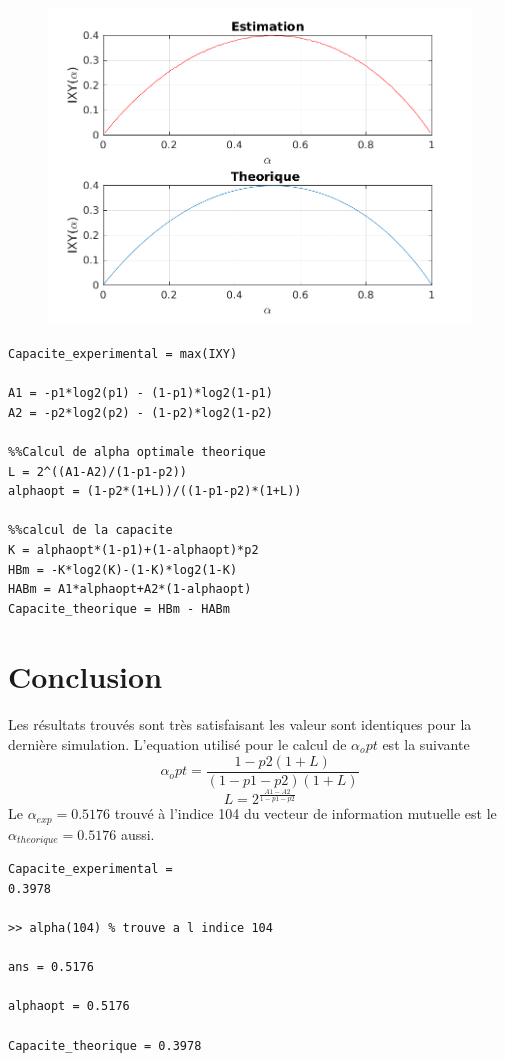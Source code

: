 \documentclass{report}
\begin{document}
\begin{figure}[h]
	\centering
	\captionsetup{justification=centering}
	\includegraphics[width=0.6\linewidth]{../canal3}
	\caption{}
	\label{fig:}
\end{figure}


\begin{lstlisting}[caption={Code calcul de capacite du canal },label=code_]
Capacite_experimental = max(IXY)

A1 = -p1*log2(p1) - (1-p1)*log2(1-p1)
A2 = -p2*log2(p2) - (1-p2)*log2(1-p2)

%%Calcul de alpha optimale theorique
L = 2^((A1-A2)/(1-p1-p2))
alphaopt = (1-p2*(1+L))/((1-p1-p2)*(1+L))

%%calcul de la capacite
K = alphaopt*(1-p1)+(1-alphaopt)*p2
HBm = -K*log2(K)-(1-K)*log2(1-K)
HABm = A1*alphaopt+A2*(1-alphaopt)
Capacite_theorique = HBm - HABm
\end{lstlisting}




\section{Conclusion}

Les résultats trouvés sont très satisfaisant les valeur sont identiques pour la dernière simulation.
L'equation utilisé pour le calcul de $\alpha_opt$ est la suivante
\begin{equation}\label{key}
\alpha_opt = \frac{1-p2(1+L)}{(1-p1-p2)(1+L)}
\end{equation}
\begin{equation}\label{key}
L = 2^{\frac{A1-A2}{1-p1-p2}}
\end{equation}
Le $\alpha_{exp} = 0.5176$ trouvé à l'indice 104 du vecteur de information mutuelle est 
le $\alpha_{theorique} = 0.5176$ aussi.
\begin{lstlisting}[caption={Resultats },label=code_resultqts]
Capacite_experimental =
0.3978

>> alpha(104) % trouve a l indice 104

ans = 0.5176

alphaopt = 0.5176

Capacite_theorique = 0.3978
\end{lstlisting}
\end{document}
